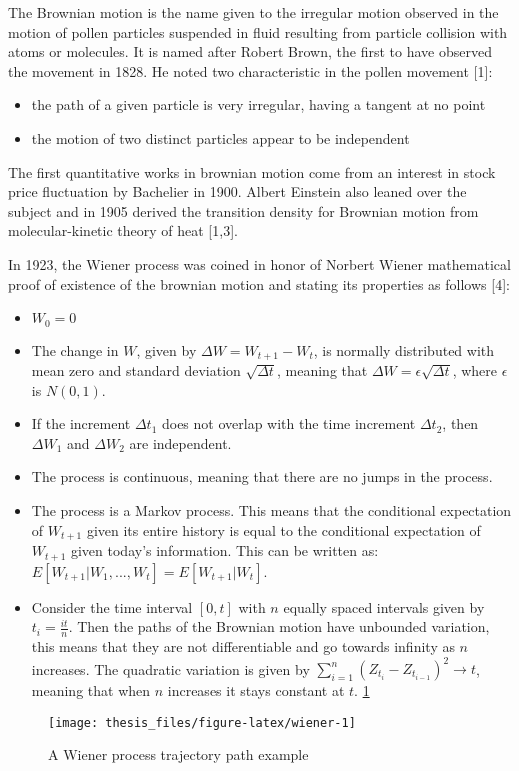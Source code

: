 \documentclass[12pt,twoside]{reedthesis}
\theoremstyle{definition}
\theoremstyle{definition}
\theoremstyle{remark}
\begin{document}
  The Brownian motion is the name given to the irregular motion observed
  in the motion of pollen particles suspended in fluid resulting from
  particle collision with atoms or molecules. It is named after Robert
  Brown, the first to have observed the movement in 1828. He noted two
  characteristic in the pollen movement {[}1{]}:
  \begin{itemize}
  \item
    the path of a given particle is very irregular, having a tangent at no
    point
  \item
    the motion of two distinct particles appear to be independent
  \end{itemize}
  The first quantitative works in brownian motion come from an interest in
  stock price fluctuation by Bachelier in 1900. Albert Einstein also
  leaned over the subject and in 1905 derived the transition density for
  Brownian motion from molecular-kinetic theory of heat {[}1,3{]}.
  
  In 1923, the Wiener process was coined in honor of Norbert Wiener
  mathematical proof of existence of the brownian motion and stating its
  properties as follows {[}4{]}:
  \begin{itemize}
  \item
    \(W_{0}=0\)
  \item
    The change in \(W\), given by \(\Delta W = W_{t+1}-W_{t}\), is
    normally distributed with mean zero and standard deviation
    \(\sqrt{\Delta t}\), meaning that
    \(\Delta W = \epsilon\sqrt{\Delta t}\), where \(\epsilon\) is
    \(N(0,1)\).
  \item
    If the increment \(\Delta t_1\) does not overlap with the time
    increment \(\Delta t_2\), then \(\Delta W_1\) and \(\Delta W_2\) are
    independent.
  \item
    The process is continuous, meaning that there are no jumps in the
    process.
  \item
    The process is a Markov process. This means that the conditional
    expectation of \(W_{t+1}\) given its entire history is equal to the
    conditional expectation of \(W_{t+1}\) given today's information. This
    can be written as: \(E[W_{t+1}|W_1, ..., W_t] = E[W_{t+1}|W_t]\).
  \item
    Consider the time interval \([0,t]\) with \(n\) equally spaced
    intervals given by \(t_i = \frac{it}{n}\). Then the paths of the
    Brownian motion have unbounded variation, this means that they are not
    differentiable and go towards infinity as \(n\) increases. The
    quadratic variation is given by
    \(\sum_{i=1}^{n}{(Z_{t_i}-Z_{t_{i-1}})^2} \rightarrow t\), meaning
    that when \(n\) increases it stays constant at \(t\). \ref{fig:wiener}
  \end{itemize}
  \begin{figure}
  
  {\centering \texttt{[image: thesis\_files/figure-latex/wiener-1]} 
  
  }
  
  \caption{A Wiener process trajectory path example}\label{fig:wiener}
  \end{figure}
\end{document}
